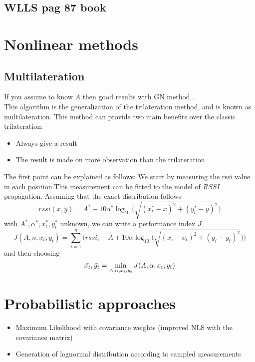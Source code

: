 \documentclass[12pt]{report}
\begin{document}
\subsection{WLLS pag 87 book}

\clearpage

\section{Nonlinear methods}
\subsection{Multilateration}
If you assume to know $A$ then good results with GN method...\\
This algorithm is the generalization of the trilateration method, and is known as multilateration. 
This method can provide two main benefits over the classic trilateration:
\begin{itemize}
    \item Always give a result
    \item The result is made on more observation than the trilateration
\end{itemize}
The first point can be explained as follows:
We start by measuring the rssi value in each position.This measurement can be fitted to the model of $RSSI$ propagation. Assuming that the exact distribution follows 
\begin{equation}
rssi(x,y)=A^*-10\alpha^*\log_{10}\big(\sqrt{(x_t^*-x)^2+(y_t^*-y)^2}\big)    
\end{equation}
with $A^*,\alpha^*,x^*_t,y^*_t$ unknown, we can write a performance index $J$
\begin{equation}
    J(A,n,x_t,y_t)=\sum_{i=1}^n\bigg(rssi_i-A+10\alpha\log_{10}\big(\sqrt{(x_i-x_t)^2+(y_i-y_t)^2}\big)\bigg)
\end{equation}
and then choosing 
\begin{equation}
\Bar{x_t}, \Bar{y_t}=\min_{A,\alpha,x_t,y_t}J(A,\alpha,x_t,y_t)
\end{equation}

\clearpage

\section{Probabilistic approaches}
\begin{itemize}
    \item Maximum Likelihood with covariance weights (improved NLS with the covariance matrix)
    \item Generation of lognormal distribution according to sampled measurements
\end{itemize}
\clearpage
\end{document}
